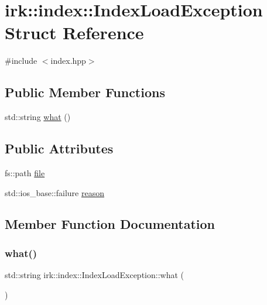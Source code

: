\hypertarget{structirk_1_1index_1_1IndexLoadException}{}\section{irk\+:\+:index\+:\+:Index\+Load\+Exception Struct Reference}
\label{structirk_1_1index_1_1IndexLoadException}


{\ttfamily \#include $<$index.\+hpp$>$}

\subsection*{Public Member Functions}
\begin{DoxyCompactItemize}
\item 
std\+::string \mbox{\hyperlink{structirk_1_1index_1_1IndexLoadException_a4e388ade9d002ca3b384554366be6f55}{what}} ()
\end{DoxyCompactItemize}
\subsection*{Public Attributes}
\begin{DoxyCompactItemize}
\item 
fs\+::path \mbox{\hyperlink{structirk_1_1index_1_1IndexLoadException_af9da16c7937d26791c5f4de5b29f0164}{file}}
\item 
std\+::ios\+\_\+base\+::failure \mbox{\hyperlink{structirk_1_1index_1_1IndexLoadException_a589d8d2fb72c6ed4643dda1d905f64e5}{reason}}
\end{DoxyCompactItemize}


\subsection{Member Function Documentation}
\mbox{\label{structirk_1_1index_1_1IndexLoadException_a4e388ade9d002ca3b384554366be6f55}} 
\subsubsection{\texorpdfstring{what()}{what()}}
{\footnotesize\ttfamily std\+::string irk\+::index\+::\+Index\+Load\+Exception\+::what (\begin{DoxyParamCaption}{ }\end{DoxyParamCaption})\hspace{0.3cm}{\ttfamily [inline]}}



